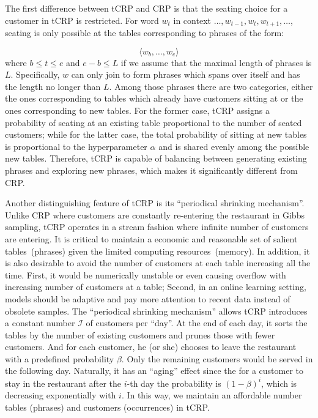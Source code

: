 The first difference between tCRP and CRP is that the seating choice for a
customer in tCRP is restricted. For word $w_t$ in context $\dots, w_{t-1}, w_t,
w_{t+1}, \dots$, seating is only possible at the tables corresponding to phrases
of the form:

$$\langle w_b, \dots, w_e \rangle$$
where $b \le t \le e$ and $e - b \le L$ if we assume that the maximal length of
phrases is $L$. Specifically, $w$ can only join to form phrases which spans over
itself and has the length no longer than $L$. Among those phrases there are two
categories, either the ones corresponding to tables which already have customers
sitting at or the ones corresponding to new tables. For the former case, tCRP
assigns a probability of seating at an existing table proportional to the number
of seated customers; while for the latter case, the total probability of sitting
at new tables is proportional to the hyperparameter $\alpha$ and is shared
evenly among the possible new tables. Therefore, tCRP is capable of balancing
between generating existing phrases and exploring new phrases, which makes it
significantly different from CRP.

Another distinguishing feature of tCRP is its ``periodical shrinking
mechanism''. Unlike CRP where customers are constantly re-entering the
restaurant in Gibbs sampling, tCRP operates in a stream fashion where infinite
number of customers are entering. It is critical to maintain a economic and
reasonable set of salient tables~(phrases) given the limited computing
resources~(memory). In addition, it is also desirable to avoid the number of
customers at each table increasing all the time. First, it would be numerically
unstable or even causing overflow with increasing number of customers at a
table; Second, in an online learning setting, models should be adaptive and pay
more attention to recent data instead of obsolete samples. The ``periodical
shrinking mechanism'' allows tCRP introduces a constant number $\mathcal{I}$ of
customers per ``day''. At the end of each day, it sorts the tables by the number
of existing customers and prunes those with fewer customers. And for each
customer, he (or she) chooses to leave the restaurant with a predefined
probability $\beta$. Only the remaining customers would be served in the
following day. Naturally, it has an ``aging'' effect since the for a customer to
stay in the restaurant after the $i$-th day the probability is $(1 - \beta)^i$,
which is decreasing exponentially with $i$. In this way, we maintain an
affordable number tables (phrases) and customers (occurrences) in tCRP.

